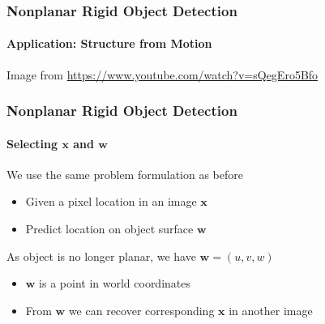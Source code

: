 \documentclass[xetex,professionalfont]{beamer}
\renewcommand{\vec}[1]{\ensuremath{\mathbf{#1}}}
\newcommand{\vw}{\vec{w}}
\newcommand{\vx}{\vec{x}}
\begin{document}

\begin{frame}
\frametitle{Nonplanar Rigid Object Detection}
\framesubtitle{Application: Structure from Motion}

\begin{center}
    {\centering Image from \url{https://www.youtube.com/watch?v=sQegEro5Bfo}}
\end{center}

\end{frame}


\begin{frame}
\frametitle{Nonplanar Rigid Object Detection}
\framesubtitle{Selecting $\vx$ and $\vw$}

We use the same problem formulation as before
\begin{itemize}
    \item Given a pixel location in an image $\vx$
    \item Predict location on object surface $\vw$
\end{itemize}

\bigskip
As object is no longer planar, we have $\vw=(u,v,w)$
\begin{itemize}
    \item $\vw$ is a point in world coordinates
    \item From $\vw$ we can recover corresponding $\vx$ in another image
\end{itemize}

\end{frame}

\end{document}
